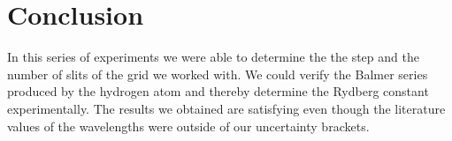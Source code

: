 \documentclass{scrartcl}
\begin{document}
\section{Conclusion}
In this series of experiments we were able to determine the the step and the number of slits of the grid we worked with. We could verify the Balmer series produced by the hydrogen atom and thereby determine the Rydberg constant experimentally. The results we obtained are satisfying even though the literature values of the wavelengths were outside of our uncertainty brackets.
\end{document}
